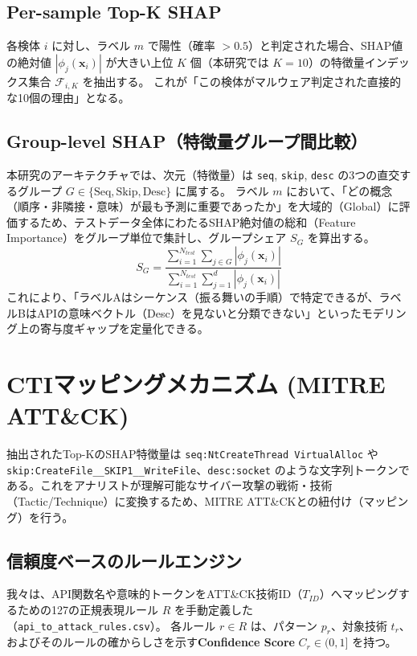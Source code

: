 \documentclass[11pt,a4paper,dvipdfmx]{article}
\begin{document}
\subsection{Per-sample Top-K SHAP}
各検体 $i$ に対し、ラベル $m$ で陽性（確率 $> 0.5$）と判定された場合、SHAP値の絶対値 $|\phi_j(\mathbf{x}_i)|$ が大きい上位 $K$ 個（本研究では $K=10$）の特徴量インデックス集合 $\mathcal{F}_{i,K}$ を抽出する。
これが「この検体がマルウェア判定された直接的な10個の理由」となる。

\subsection{Group-level SHAP（特徴量グループ間比較）}
本研究のアーキテクチャでは、次元（特徴量）は \texttt{seq}, \texttt{skip}, \texttt{desc} の3つの直交するグループ $G \in \{\text{Seq}, \text{Skip}, \text{Desc}\}$ に属する。
ラベル $m$ において、「どの概念（順序・非隣接・意味）が最も予測に重要であったか」を大域的（Global）に評価するため、テストデータ全体にわたるSHAP絶対値の総和（Feature Importance）をグループ単位で集計し、グループシェア $S_G$ を算出する。
\begin{equation}
    S_G = \frac{\sum_{i=1}^{N_{test}} \sum_{j \in G} |\phi_j(\mathbf{x}_i)|}{\sum_{i=1}^{N_{test}} \sum_{j=1}^{d} |\phi_j(\mathbf{x}_i)|}
\end{equation}
これにより、「ラベルAはシーケンス（振る舞いの手順）で特定できるが、ラベルBはAPIの意味ベクトル（Desc）を見ないと分類できない」といったモデリング上の寄与度ギャップを定量化できる。

\section{CTIマッピングメカニズム (MITRE ATT\&CK)}

抽出されたTop-KのSHAP特徴量は \texttt{seq:NtCreateThread VirtualAlloc} や \texttt{skip:CreateFile\_\_SKIP1\_\_WriteFile}、\texttt{desc:socket} のような文字列トークンである。これをアナリストが理解可能なサイバー攻撃の戦術・技術（Tactic/Technique）に変換するため、MITRE ATT\&CKとの紐付け（マッピング）を行う。

\subsection{信頼度ベースのルールエンジン}
我々は、API関数名や意味的トークンをATT\&CK技術ID（$T_{ID}$）へマッピングするための127の正規表現ルール $R$ を手動定義した（\texttt{api\_to\_attack\_rules.csv}）。
各ルール $r \in R$ は、パターン $p_r$、対象技術 $t_r$、およびそのルールの確からしさを示す\textbf{Confidence Score} $C_r \in (0, 1]$ を持つ。
\end{document}
